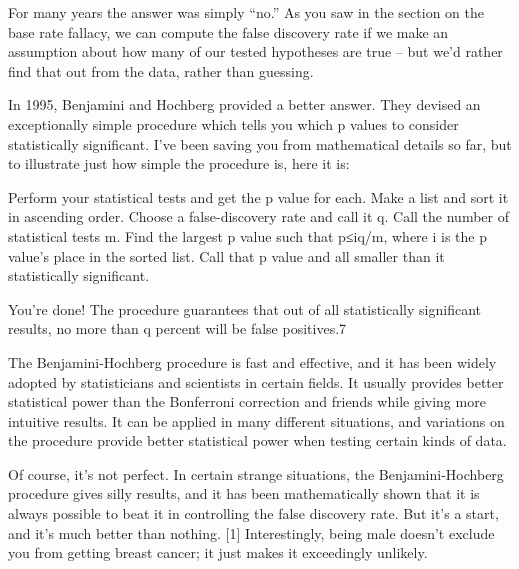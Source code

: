 For many years the answer was simply “no.” As you saw in the section on the base rate fallacy, we can compute the false discovery rate if we make an assumption about how many of our tested hypotheses are true – but we’d rather find that out from the data, rather than guessing.

In 1995, Benjamini and Hochberg provided a better answer. They devised an exceptionally simple procedure which tells you which p values to consider statistically significant. I’ve been saving you from mathematical details so far, but to illustrate just how simple the procedure is, here it is:

    Perform your statistical tests and get the p value for each. Make a list and sort it in ascending order.
    Choose a false-discovery rate and call it q. Call the number of statistical tests m.
    Find the largest p value such that p≤iq/m, where i is the p value’s place in the sorted list.
    Call that p value and all smaller than it statistically significant.

You’re done! The procedure guarantees that out of all statistically significant results, no more than q percent will be false positives.7

The Benjamini-Hochberg procedure is fast and effective, and it has been widely adopted by statisticians and scientists in certain fields. It usually provides better statistical power than the Bonferroni correction and friends while giving more intuitive results. It can be applied in many different situations, and variations on the procedure provide better statistical power when testing certain kinds of data.

Of course, it’s not perfect. In certain strange situations, the Benjamini-Hochberg procedure gives silly results, and it has been mathematically shown that it is always possible to beat it in controlling the false discovery rate. But it’s a start, and it’s much better than nothing.
[1]	Interestingly, being male doesn’t exclude you from getting breast cancer; it just makes it exceedingly unlikely.
